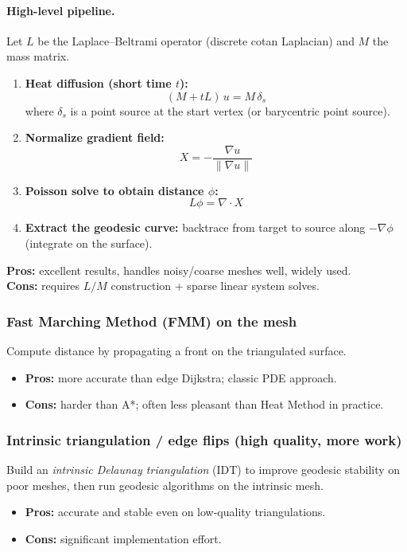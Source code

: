 \documentclass[12pt,a4paper]{article}
\theoremstyle{plain}
\theoremstyle{definition}
\begin{document}
	\paragraph{High-level pipeline.}
	Let $L$ be the Laplace--Beltrami operator (discrete cotan Laplacian) and $M$ the mass matrix.
	\begin{enumerate}
		\item \textbf{Heat diffusion (short time $t$):}
		\[
		(M + tL)\,u = M\,\delta_s
		\]
		where $\delta_s$ is a point source at the start vertex (or barycentric point source).
		
		\item \textbf{Normalize gradient field:}
		\[
		X = -\frac{\nabla u}{\|\nabla u\|}
		\]
		
		\item \textbf{Poisson solve to obtain distance $\phi$:}
		\[
		L\phi = \nabla\cdot X
		\]
		
		\item \textbf{Extract the geodesic curve:}
		backtrace from target to source along $-\nabla\phi$ (integrate on the surface).
	\end{enumerate}
	
	\textbf{Pros:} excellent results, handles noisy/coarse meshes well, widely used. \\
	\textbf{Cons:} requires $L/M$ construction + sparse linear system solves.
	
		\subsubsection*{Fast Marching Method (FMM) on the mesh}
	Compute distance by propagating a front on the triangulated surface.
	\begin{itemize}
		\item \textbf{Pros:} more accurate than edge Dijkstra; classic PDE approach.
		\item \textbf{Cons:} harder than A*; often less pleasant than Heat Method in practice.
	\end{itemize}
	
		\subsubsection*{Intrinsic triangulation / edge flips (high quality, more work)}
	Build an \emph{intrinsic Delaunay triangulation} (IDT) to improve geodesic stability on poor meshes,
	then run geodesic algorithms on the intrinsic mesh.
	\begin{itemize}
		\item \textbf{Pros:} accurate and stable even on low-quality triangulations.
		\item \textbf{Cons:} significant implementation effort.
	\end{itemize}
	
\end{document}
